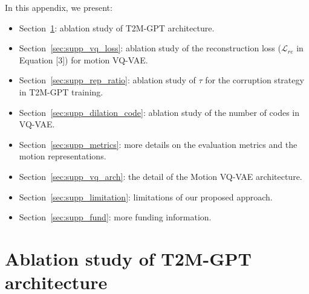 \documentclass[10pt,twocolumn,letterpaper]{article}
\begin{document}
{\small


}

\clearpage
\appendix
{}

In this appendix, we present:
\begin{itemize}
    \item Section~\ref{sec:supp_trans_arch}: ablation study of T2M-GPT architecture.
    \item Section~\ref{sec:supp_vq_loss}: ablation study of the reconstruction loss ($\mathcal{L}_{re}$ in Equation [3]) for motion VQ-VAE.
    \item Section~\ref{sec:supp_rep_ratio}: ablation study of $\tau$ for the corruption strategy in T2M-GPT training.
    \item Section~\ref{sec:supp_dilation_code}: ablation study of the number of codes in VQ-VAE.
    \item Section~\ref{sec:supp_metrics}: more details on the evaluation metrics and the motion representations.
    \item Section~\ref{sec:supp_vq_arch}: the detail of the Motion VQ-VAE architecture.
    \item Section~\ref{sec:supp_limitation}: limitations of our proposed approach.
    \item Section~\ref{sec:supp_fund}: more funding information.
\end{itemize}


\section{Ablation study of T2M-GPT architecture}
\label{sec:supp_trans_arch}
\end{document}
